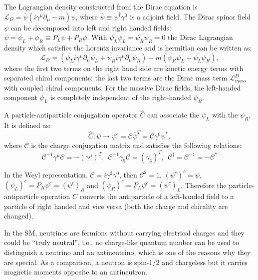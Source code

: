 The Lagrangian density constructed from the Dirac equation is $\mathcal{L}_D = \bar\psi(i\gamma^\mu\partial_\mu-m)\psi$, where $\bar{\psi}\equiv \psi^{\dag}\gamma^0$ is a adjoint field. The Dirac spinor field $\psi$ can be decomposed into left and right handed fields: $\psi=\psi_L+\psi_R\equiv P_L\psi+P_R\psi$. With $\overline{\psi_L}\psi_L=\overline{\psi_R}\psi_R=0$ the Dirac Lagrangian density which satisfies the Lorentz invariance and is hermitian can be written as\cite{zee2010quantum}:
\begin{equation}\label{diracLagrange}
\mathcal{L}_D = (\overline{\psi_L} i\gamma^\mu\partial_\mu\psi_L+\overline{{\psi}_R} i\gamma^\mu\partial_\mu\psi_R)-m(\overline{{\psi}_R}\psi_L+\overline{{\psi}_L}\psi_R),
\end{equation} 
where the first two terms on the right hand side are kinetic energy terms with separated chiral components; the last two terms are the Dirac mass term $\mathcal{L}^{D}_{mass}$ with coupled chiral components. For the massive Dirac fields, the left-handed component $\psi_L$ is completely independent of the right-handed $\psi_R$. 

A particle-antiparticle conjugation operator $\hat C$ can associate the $\psi_L$ with the $\psi_R$. It is defined as\cite{akhmedov2014majorana}:
\begin{equation}
\hat C: \psi\to \psi^c=\mathcal{C}\bar\psi^T=\mathcal{C}\gamma^0\psi^*,
\end{equation}
where $\mathcal C$ is the charge conjugation matrix and satisfies the following relations:
\begin{equation}
\mathcal C^{-1}\gamma^\mu\mathcal C=-(\gamma^\mu)^T,~~\mathcal{C}^{-1}\gamma_5\mathcal{C}=(\gamma_5)^T,~~\mathcal{C}^\dagger = \mathcal{C}^{-1}=-\mathcal{C}^*
\end{equation}

In the Weyl representation, $\mathcal{C}=i\gamma^2\gamma^0$, then $\mathcal {C}^2=1$, $(\psi^c)^c=\psi$, $(\psi_L)^c=P_R\psi^c=(\psi^c)_R$ and $(\psi_R)^c=P_L\psi^c=(\psi^c)_L$. Therefore the particle-antiparticle operation $\hat C$ converts the antiparticle of a left-handed field to a particle of right handed and vice versa (both the charge and chirality are changed).

In the SM, neutrinos are fermions without carrying electrical charges and they could be ``truly neutral'', i.e., no charge-like quantum number can be used to distinguish a neutrino and an antineutrino, which is one of the reasons why they are special. As a comparison, a neutron is spin-1/2 and chargeless but it carries magnetic moments opposite to an antineutron\cite{akhmedov2014majorana}.

